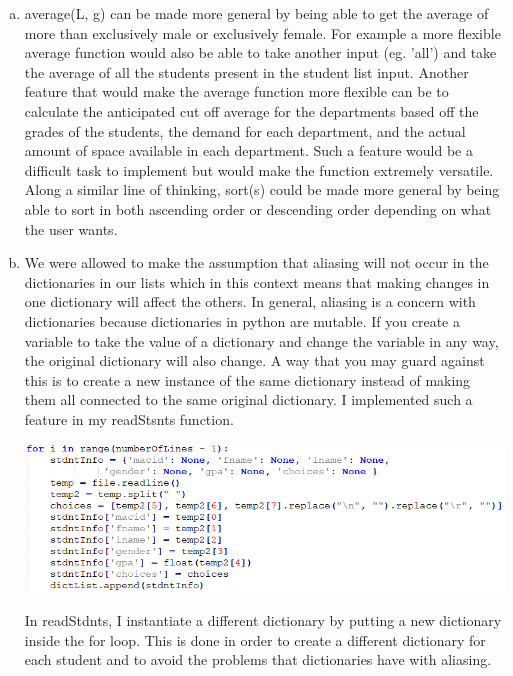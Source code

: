 \documentclass[12pt]{article}
\begin{document}
\begin{enumerate}[(a)]

\item average(L, g) can be made more general by being able to get the average of more than exclusively male or exclusively female. For example a more flexible average function would also be able to take another input (eg. 'all') and take the average of all the students present in the student list input. Another feature that would make the average function more flexible can be to calculate the anticipated cut off average for the departments based off the grades of the students, the demand for each department, and the actual amount of space available in each department. Such a feature would be a difficult task to implement but would make the function extremely versatile. Along a similar line of thinking, sort(s) could be made more general by being able to sort in both ascending order or descending order depending on what the user wants.

\item We were allowed to make the assumption that aliasing will not occur in the dictionaries in our lists which in this context means that making changes in one dictionary will affect the others. In general, aliasing is a concern with dictionaries because dictionaries in python are mutable. If you create a variable to take the value of a dictionary and change the variable in any way, the original dictionary will also change. A way that you may guard against this is to create a new instance of the same dictionary instead of making them all connected to the same original dictionary. I implemented such a feature in my readStsnts function.

\begin{center}
	\includegraphics{a12}
\end{center}

In readStdnts, I instantiate a different dictionary by putting a new dictionary inside the for loop. This is done in order to create a different dictionary for each student and to avoid the problems that dictionaries have with aliasing.


\end{enumerate}
\end{document}
